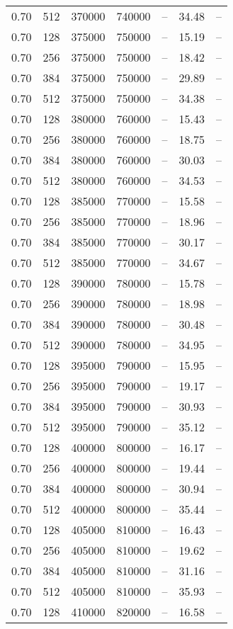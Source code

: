 \begin{tabular}{l|l|l|l|l|l|l}
0.70 & 512 & 370000 & 740000 & -- & 34.48 & --\\
0.70 & 128 & 375000 & 750000 & -- & 15.19 & --\\
0.70 & 256 & 375000 & 750000 & -- & 18.42 & --\\
0.70 & 384 & 375000 & 750000 & -- & 29.89 & --\\
0.70 & 512 & 375000 & 750000 & -- & 34.38 & --\\
0.70 & 128 & 380000 & 760000 & -- & 15.43 & --\\
0.70 & 256 & 380000 & 760000 & -- & 18.75 & --\\
0.70 & 384 & 380000 & 760000 & -- & 30.03 & --\\
0.70 & 512 & 380000 & 760000 & -- & 34.53 & --\\
0.70 & 128 & 385000 & 770000 & -- & 15.58 & --\\
0.70 & 256 & 385000 & 770000 & -- & 18.96 & --\\
0.70 & 384 & 385000 & 770000 & -- & 30.17 & --\\
0.70 & 512 & 385000 & 770000 & -- & 34.67 & --\\
0.70 & 128 & 390000 & 780000 & -- & 15.78 & --\\
0.70 & 256 & 390000 & 780000 & -- & 18.98 & --\\
0.70 & 384 & 390000 & 780000 & -- & 30.48 & --\\
0.70 & 512 & 390000 & 780000 & -- & 34.95 & --\\
0.70 & 128 & 395000 & 790000 & -- & 15.95 & --\\
0.70 & 256 & 395000 & 790000 & -- & 19.17 & --\\
0.70 & 384 & 395000 & 790000 & -- & 30.93 & --\\
0.70 & 512 & 395000 & 790000 & -- & 35.12 & --\\
0.70 & 128 & 400000 & 800000 & -- & 16.17 & --\\
0.70 & 256 & 400000 & 800000 & -- & 19.44 & --\\
0.70 & 384 & 400000 & 800000 & -- & 30.94 & --\\
0.70 & 512 & 400000 & 800000 & -- & 35.44 & --\\
0.70 & 128 & 405000 & 810000 & -- & 16.43 & --\\
0.70 & 256 & 405000 & 810000 & -- & 19.62 & --\\
0.70 & 384 & 405000 & 810000 & -- & 31.16 & --\\
0.70 & 512 & 405000 & 810000 & -- & 35.93 & --\\
0.70 & 128 & 410000 & 820000 & -- & 16.58 & --\\

\end{tabular}
